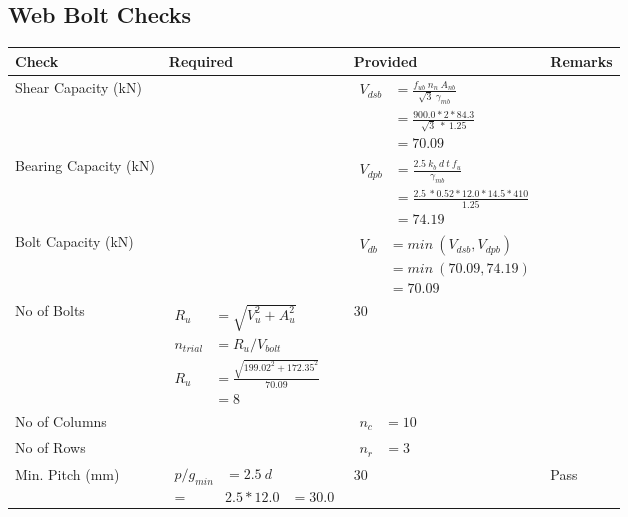 \documentclass{article}%
\begin{document}
\subsection{Web Bolt Checks}%
\label{subsec:WebBoltChecks}%
\renewcommand{\arraystretch}{1.2}%
\begin{longtable}{|p{4cm}|p{5cm}|p{5.5cm}|p{1.5cm}|}%
\hline%
\rowcolor{OsdagGreen}%
Check&Required&Provided&Remarks\\%
\hline%
\endhead%
\hline%
Shear Capacity (kN)&&$\begin{aligned}V_{dsb} &= \frac{f_{ub} ~n_n~ A_{nb}}{\sqrt{3} ~\gamma_{mb}}\\ &= \frac{900.0*2*84.3}{\sqrt{3}~*~1.25}\\ &= 70.09\end{aligned}$&\\%
\hline%
Bearing Capacity (kN)&&$\begin{aligned}V_{dpb} &= \frac{2.5~ k_b~ d~ t~ f_u}{\gamma_{mb}}\\ &= \frac{2.5~*0.52*12.0*14.5*410}{1.25}\\ &=74.19\end{aligned}$&\\%
\hline%
Bolt Capacity (kN)&&$\begin{aligned}V_{db} &= min~ (V_{dsb}, V_{dpb})\\ &= min~ (70.09,74.19)\\ &=70.09\end{aligned}$&\\%
\hline%
No of Bolts&$\begin{aligned}R_{u} &= \sqrt{V_u^2+A_u^2}\\ n_{trial} &= R_u/ V_{bolt}\\ R_{u} &= \frac{\sqrt{199.02^2+172.35^2}}{70.09}\\ &=8\end{aligned}$&30&\\%
\hline%
No of Columns&&$\begin{aligned} n_c &=10\end{aligned}$&\\%
\hline%
No of Rows&&$\begin{aligned} n_r &=3\end{aligned}$&\\%
\hline%
Min. Pitch (mm)&$\begin{aligned}p/g_{min}&= 2.5 ~ d&\\ =&2.5*12.0&=30.0\end{aligned}$&30&Pass\\%
\hline%

\end{longtable}
\end{document}
